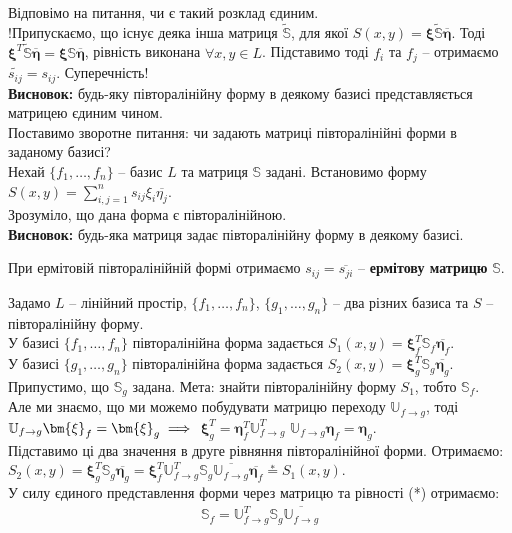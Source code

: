 \documentclass{math_library}
\begin{document}
Відповімо на питання, чи є такий розклад єдиним. \\
!Припускаємо, що існує деяка інша матриця $\widetilde{\mathbb{S}}$, для якої $S(x,y) = \bm{\xi} \widetilde{\mathbb{S}} \overline{\bm{\eta}}$. Тоді $\bm{\xi}^T \widetilde{\mathbb{S}} \overline{\bm{\eta}} = \bm{\xi} \mathbb{S} \overline{\bm{\eta}}$, рівність виконана $\forall x,y \in L$. Підставимо тоді $f_i$ та $f_j$ -- отримаємо $\widetilde{s_{ij}} = s_{ij}$. Суперечність!\\
\textbf{Висновок:} будь-яку півторалінійну форму в деякому базисі представляється матрицею єдиним чином.
\bigskip \\
Поставимо зворотне питання: чи задають матриці півторалінійні форми в заданому базисі?\\
Нехай $\{f_1,\dots,f_n\}$ -- базис $L$ та матриця $\mathbb{S}$ задані. Встановимо форму $S(x,y) = \displaystyle\sum_{i,j=1}^n s_{ij}\xi_i \overline{\eta_j}$.\\
Зрозуміло, що дана форма є півторалінійною.\\
\textbf{Висновок:} будь-яка матриця задає півторалінійну форму в деякому базисі.

\begin{remark}
При ермітовій півторалінійній формі отримаємо $s_{ij} = \overline{s_{ji}}$ -- \textbf{ермітову матрицю} $\mathbb{S}$.
\end{remark}

\noindent
Задамо $L$ -- лінійний простір, $\{f_1,\dots,f_n\}$, $\{g_1,\dots,g_n\}$ -- два різних базиса та $S$ -- півторалінійну форму.\\
У базисі $\{f_1,\dots,f_n\}$ півторалінійна форма задається $S_1(x,y) = \bm{\xi}^T_f \mathbb{S}_f \overline{\bm{\eta}_f}$.\\
У базисі $\{g_1,\dots,g_n\}$ півторалінійна форма задається $S_2(x,y) = \bm{\xi}^T_g \mathbb{S}_g \overline{\bm{\eta}_g}$.\\
Припустимо, що $\mathbb{S}_g$ задана. Мета: знайти півторалінійну форму $S_1$, тобто $\mathbb{S}_f$.\\
Але ми знаємо, що ми можемо побудувати матрицю переходу $\mathbb{U}_{f \to g}$, тоді $\mathbb{U}_{f \to g} \bm{\xi}_f = \bm{\xi}_g \implies \\ $ 
$\bm{\xi}_g^T = \bm{\eta}_f^T \mathbb{U}_{f \to g}^T$ \qquad $\mathbb{U}_{f \to g} \bm{\eta}_f = \bm{\eta}_g$.\\
Підставимо ці два значення в друге рівняння півторалінійної форми. Отримаємо:\\
$S_2(x,y) = \bm{\xi}_g^T \mathbb{S}_g \overline{\bm{\eta}_g} = \bm{\xi}_f^T \mathbb{U}^T_{f \to g} \mathbb{S}_g \overline{\mathbb{U}_{f \to g}} \overline{\bm{\eta}_f} \overset{*}{=} S_1(x,y)$.\\
У силу єдиного представлення форми через матрицю та рівності (*) отримаємо:
\begin{align*}
\mathbb{S}_f = \mathbb{U}^T_{f \to g} \mathbb{S}_g \overline{\mathbb{U}_{f \to g}}
\end{align*}
\end{document}
